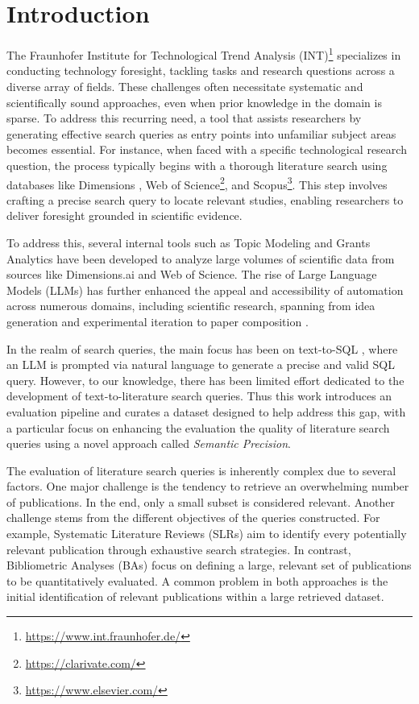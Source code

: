 \chapter{Introduction}\label{ch:intro}

The Fraunhofer Institute for Technological Trend Analysis (INT)\footnote{\url{https://www.int.fraunhofer.de/}} specializes in conducting technology foresight, tackling tasks and research questions across a diverse array of fields. These challenges often necessitate systematic and scientifically sound approaches, even when prior knowledge in the domain is sparse. To address this recurring need, a tool that assists researchers by generating effective search queries as entry points into unfamiliar subject areas becomes essential. For instance, when faced with a specific technological research question, the process typically begins with a thorough literature search using databases like Dimensions \autocite{Hook2018}, Web of Science\footnote{\url{https://clarivate.com/}}, and Scopus\footnote{\url{https://www.elsevier.com/}}. This step involves crafting a precise search query to locate relevant studies, enabling researchers to deliver foresight grounded in scientific evidence.

To address this, several internal tools such as Topic Modeling and Grants Analytics have been developed to analyze large volumes of scientific data from sources like Dimensions.ai and Web of Science. The rise of Large Language Models (LLMs) has further enhanced the appeal and accessibility of automation across numerous domains, including scientific research, spanning from idea generation and experimental iteration to paper composition \autocite{lu2024aiscientistfullyautomated}.

In the realm of search queries, the main focus has been on text-to-SQL \autocite{dong2023c3}, where an LLM is prompted via natural language to generate a precise and valid SQL query. However, to our knowledge, there has been limited effort dedicated to the development of text-to-literature search queries. Thus this work introduces an evaluation pipeline and curates a dataset designed to help address this gap, with a particular focus on enhancing the evaluation the quality of literature search queries using a novel approach called \textit{Semantic Precision}.

The evaluation of literature search queries is inherently complex due to several factors. One major challenge is the tendency to retrieve an overwhelming number of publications. In the end, only a small subset is considered relevant. Another challenge stems from the different objectives of the queries constructed. For example, Systematic Literature Reviews (SLRs) aim to identify every potentially relevant publication through exhaustive search strategies. In contrast, Bibliometric Analyses (BAs) focus on defining a large, relevant set of publications to be quantitatively evaluated. A common problem in both approaches is the initial identification of relevant publications within a large retrieved dataset.

